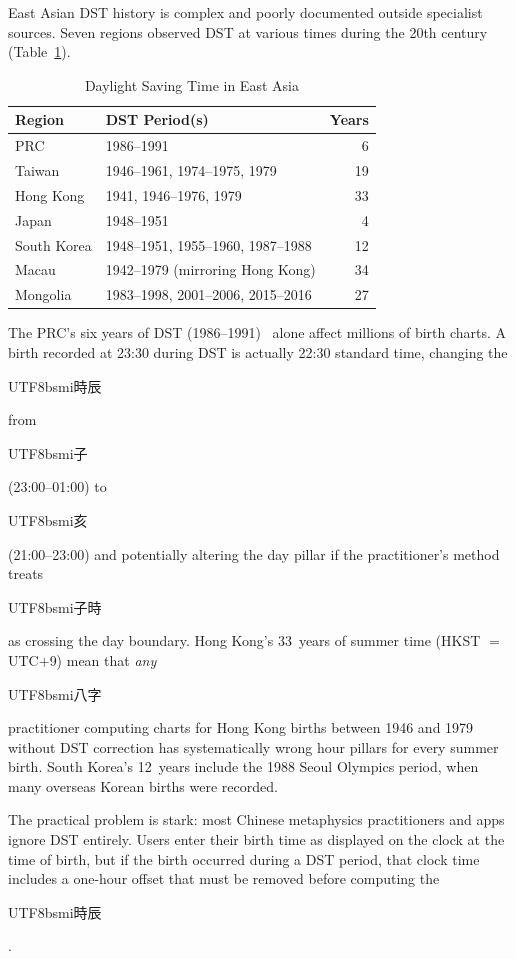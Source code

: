 \documentclass[10pt,a4paper]{article}
\newcommand{\zh}[1]{\begin{CJK}{UTF8}{bsmi}#1\end{CJK}}
\begin{document}
East Asian DST history is complex and poorly documented outside
specialist sources.  Seven regions observed DST at various times during
the 20th century~\cite{iana_tzdata_asia, dst_east_asia_research}
(Table~\ref{tab:dst_history}).

\begin{table}[H]
\centering
\caption{Daylight Saving Time in East Asia}
\label{tab:dst_history}
\small
\begin{tabular}{@{}llr@{}}
\toprule
\textbf{Region} & \textbf{DST Period(s)} & \textbf{Years} \\
\midrule
PRC             & 1986--1991                              & 6  \\
Taiwan          & 1946--1961, 1974--1975, 1979             & 19 \\
Hong Kong       & 1941, 1946--1976, 1979                   & 33 \\
Japan           & 1948--1951                               & 4  \\
South Korea     & 1948--1951, 1955--1960, 1987--1988       & 12 \\
Macau           & 1942--1979 (mirroring Hong Kong)         & 34 \\
Mongolia        & 1983--1998, 2001--2006, 2015--2016       & 27 \\
\bottomrule
\end{tabular}
\end{table}

\noindent
The PRC's six years of DST (1986--1991)~\cite{prc_dst_regulation,
iana_tzdata_asia} alone affect millions
of birth charts.  A birth recorded at 23:30 during DST is actually 22:30 standard
time, changing the \zh{時辰} from \zh{子} (23:00--01:00) to \zh{亥}
(21:00--23:00) and potentially altering the day pillar if the practitioner's
method treats \zh{子時} as crossing the day boundary.  Hong Kong's 33~years
of summer time (HKST $=$ UTC$+$9) mean that \emph{any} \zh{八字}
practitioner computing charts for Hong Kong births between 1946 and 1979
without DST correction has systematically wrong hour pillars for every
summer birth.  South Korea's 12~years include the 1988 Seoul Olympics
period, when many overseas Korean births were recorded.

The practical problem is stark: most Chinese metaphysics practitioners and
apps ignore DST entirely.  Users enter their birth time as displayed on the
clock at the time of birth, but if the birth occurred during a DST period,
that clock time includes a one-hour offset that must be removed before
computing the \zh{時辰}.
\end{document}
